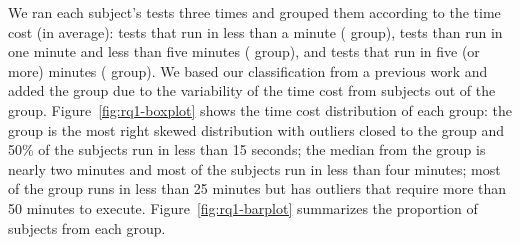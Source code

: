 


We ran each subject's tests three times and grouped them according to
the time cost (in average): tests that run in less than a minute
(\shortg{} group), tests than run in one minute and less than five
minutes (\medg{} group), and tests that run in five (or more) minutes
(\longg{} group). We based our classification from a previous work
\cite{gligoric-etal-issta2015} and added the \medg{} group due to the
variability of the time cost from subjects out of the \shortg{} group.
Figure~\ref{fig:rq1-boxplot} shows the time cost distribution of each
group: the \shortg{} group is the most right skewed distribution with
outliers closed to the \medg{} group and 50\% of the subjects run in
less than 15 seconds; the median from the \medg{} group is nearly two
minutes and most of the subjects run in less than four minutes; most
of the \longg{} group runs in less than 25 minutes but has outliers
that require more than 50 minutes to execute.
Figure~\ref{fig:rq1-barplot} summarizes the proportion of subjects
from each group.

